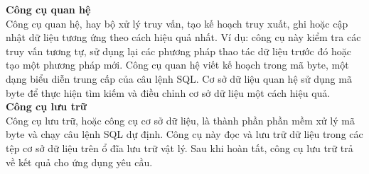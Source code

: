 
\hspace*{0.5cm}\textbf{Công cụ quan hệ}\\
\hspace*{1cm}Công cụ quan hệ, hay bộ xử lý truy vấn, tạo kế hoạch truy xuất, ghi hoặc cập nhật dữ liệu tương ứng theo cách hiệu quả nhất. Ví dụ: công cụ này kiểm tra các truy vấn tương tự, sử dụng lại các phương pháp thao tác dữ liệu trước đó hoặc tạo một phương pháp mới. Công cụ quan hệ viết kế hoạch trong mã byte, một dạng biểu diễn trung cấp của câu lệnh SQL. Cơ sở dữ liệu quan hệ sử dụng mã byte để thực hiện tìm kiếm và điều chỉnh cơ sở dữ liệu một cách hiệu quả.\\
\hspace*{1cm}\textbf{Công cụ lưu trữ}\\
\hspace*{1cm}Công cụ lưu trữ, hoặc công cụ cơ sở dữ liệu, là thành phần phần mềm xử lý mã byte và chạy câu lệnh SQL dự định. Công cụ này đọc và lưu trữ dữ liệu trong các tệp cơ sở dữ liệu trên ổ đĩa lưu trữ vật lý. Sau khi hoàn tất, công cụ lưu trữ trả về kết quả cho ứng dụng yêu cầu.
